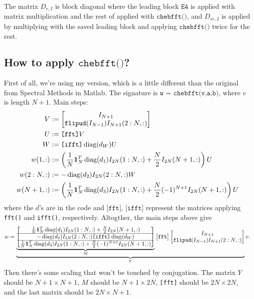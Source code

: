 \documentclass[letterpaper,12pt]{article}
\newcommand{\diag}{\operatorname{diag}}
\newcommand{\ones}{{\bf 1}}
\begin{document}
The matrix $D_{r,I}$ is block diagonal where the leading block
$\texttt{E4}$ is applied with matrix multiplication and the 
rest of applied with $\texttt{chebfft()}$, and $D_{rr,I}$ is
applied by multiplying with the saved leading block and applying
$\texttt{chebfft()}$ twice for the rest.

\subsection*{How to apply $\texttt{chebfft()}$?}

First of all, we're using my version, which is a little different
than the original from Spectral Methods in Matlab. The signature
is $\texttt{w = chebfft(v,a,b)}$, where $v$ is length $N + 1$. Main steps:
\begin{align*}
 V &:= \begin{bmatrix} I_{N+1} \\ 
      \texttt{flipud}(I_{N-1}) I_{N+1}(2:N,:)\end{bmatrix} \\ 
 U &:= \texttt{[fft]}V \\ 
 W &:= \texttt{[ifft]}\diag(d_W)U \\ 
 w(1,:) &:= \left( \frac{1}{N}\ones_N^T \diag(d_1)I_{2N}(1:N,:) + 
                   \frac{N}{2}I_{2N}(N+1,:) \right)U \\ 
 w(2:N,:) &:= -\diag(d_2)I_{2N}(2:N,:)W \\ 
 w(N+1,:) &:= \left( \frac{1}{N}\ones_N^T \diag(d_3)I_{2N}(1:N,:) + 
                     \frac{N}{2} (-1)^{N+1}I_{2N}(N+1,:) \right)U
\end{align*}
where the $d$'s are in the code and $\texttt{[fft]}$, 
$\texttt{[ifft]}$ represent the
matrices applying \texttt{fft()} and \texttt{ifft()}, respectively. 
Altogther, the main steps above give
\begin{align*}
 w =
 \underbrace{ 
 \underbrace{
 \begin{bmatrix}
   \frac{1}{N}\ones_N^T\diag(d_1)I_{2N}(1:N,:) +
                   \frac{N}{2}I_{2N}(N+1,:) \\ \hline
   -\diag(d_2)I_{2N}(2:N,:)\texttt{[ifft]}\diag(d_W) \\ \hline
   \frac{1}{N}\ones_N^T \diag(d_3)I_{2N}(1:N,:) +
        \frac{N}{2} (-1)^{N+1}I_{2N}(N+1,:)
 \end{bmatrix}
 }_M
 \begin{bmatrix} \texttt{fft} \end{bmatrix}
 \begin{bmatrix}
  I_{N+1} \\ \texttt{flipud}(I_{N-1})I_{N+1}(2:N,:)
 \end{bmatrix}
 }_Y
 v.
\end{align*}
Then there's some scaling that won't be touched by conjugation.
The matrix $Y$ should be $N+1 \times N+1$, $M$ should be
$N+1 \times 2N$, \texttt{[fft]} should be $2N \times 2N$, and
the last matrix should be $2N \times N+1$.
\end{document}
